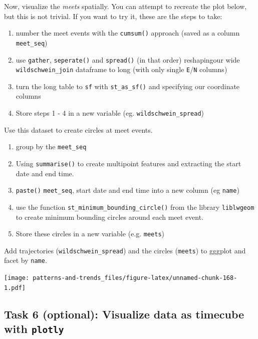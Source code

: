 \documentclass[]{book}
\providecommand{\tightlist}{%
  \setlength{\itemsep}{0pt}\setlength{\parskip}{0pt}}
\begin{document}
Now, visualize the \emph{meets} spatially. You can attempt to recreate
the plot below, but this is not trivial. If you want to try it, these
are the steps to take:

\begin{enumerate}
\def\labelenumi{\arabic{enumi}.}
\tightlist
\item
  number the meet events with the \texttt{cumsum()} approach (saved as a
  column \texttt{meet\_seq})
\item
  use \texttt{gather}, \texttt{seperate()} and \texttt{spread()} (in
  that order) reshapingour wide \texttt{wildschwein\_join} dataframe to
  long (with only single \texttt{E}/\texttt{N} columns)
\item
  turn the long table to \texttt{sf} with \texttt{st\_as\_sf()} and
  specifying our coordinate columns
\item
  Store steps 1 - 4 in a new variable (eg. \texttt{wildschwein\_spread})
\end{enumerate}

Use this dataset to create circles at meet events.

\begin{enumerate}
\def\labelenumi{\arabic{enumi}.}
\tightlist
\item
  group by the \texttt{meet\_seq}
\item
  Using \texttt{summarise()} to create multipoint features and
  extracting the start date and end time.
\item
  \texttt{paste()} \texttt{meet\_seq}, start date and end time into a
  new column (eg \texttt{name})
\item
  use the function \texttt{st\_minimum\_bounding\_circle()} from the
  library \texttt{liblwgeom} to create minimum bounding circles around
  each meet event.
\item
  Store these circles in a new variable (e.g. \texttt{meets})
\end{enumerate}

Add trajectories (\texttt{wildschwein\_spread}) and the circles
(\texttt{meets}) to gggplot and facet by \texttt{name}.

\texttt{[image: patterns-and-trends\_files/figure-latex/unnamed-chunk-168-1.pdf]}

\subsection{\texorpdfstring{Task 6 (optional): Visualize data as
timecube with
\texttt{plotly}}{Task 6 (optional): Visualize data as timecube with plotly}}\label{task-6-optional-visualize-data-as-timecube-with-plotly}
\end{document}
